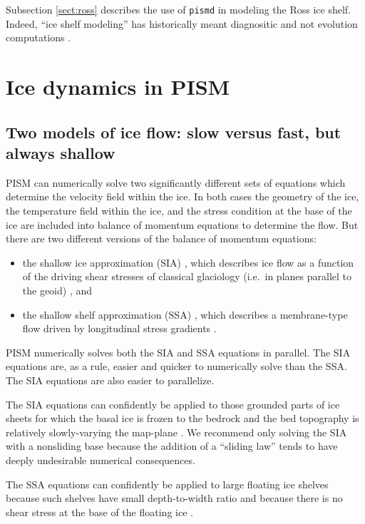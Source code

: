 \documentclass[11pt,final]{amsart}
\begin{document}
Subsection \ref{sect:ross} describes the use of \verb|pismd| in modeling the Ross ice shelf.  Indeed, ``ice shelf modeling'' has historically meant diagnositic and not evolution computations \cite{MacAyealetal,HumbertGreveHutter}.




\clearpage
\newpage
\section{Ice dynamics in PISM}\label{sect:dynamics}

\subsection{Two models of ice flow: slow versus fast, but always shallow}  PISM can numerically solve two significantly different sets of equations which determine the velocity field within the ice.  In both cases the geometry of the ice, the temperature field within the ice, and the stress condition at the base of the ice are included into balance of momentum equations to determine the flow.  But there are two different versions of the balance of momentum equations:\begin{itemize}
\item the shallow ice approximation (SIA) \cite{Hutter}, which describes ice flow as a function of the driving shear stresses of classical glaciology (i.e.~in planes parallel to the geoid) \cite{Paterson}, and
\item the shallow shelf approximation (SSA) \cite{WeisGreveHutter}, which describes a membrane-type flow driven by longitudinal stress gradients \cite{Morland,MacAyeal,SchoofStream}.
\end{itemize}
PISM numerically solves both the SIA and SSA equations in parallel.  The SIA equations are, as a rule, easier and quicker to numerically solve than the SSA.  The SIA equations are also easier to parallelize.

The SIA equations can confidently be applied to those grounded parts of ice sheets for which the basal ice is frozen to the bedrock and the bed topography is relatively slowly-varying the map-plane \cite{Fowler}.  We recommend only solving the SIA with a nonsliding base because the addition of a ``sliding law'' tends to have deeply undesirable numerical consequences.

The SSA equations can confidently be applied to large floating ice shelves because such shelves have small depth-to-width ratio and because there is no shear stress at the base of the floating ice \cite{Morland,MorlandZainuddin}.
\end{document}
